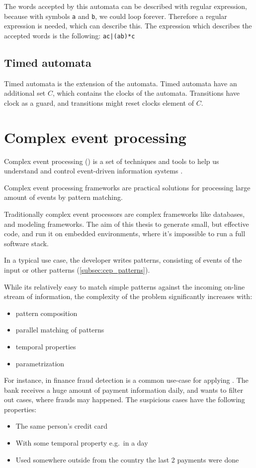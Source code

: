 The words accepted by this automata can be described with regular expression, because with symbols \texttt{a} and \texttt{b}, we could loop forever. Therefore a regular expression is needed, which can describe this. The expression which describes the accepted words is the following: \verb+ac|(ab)*c+

\subsection{Timed automata}

Timed automata is the extension of the automata. Timed automata have an additional set $C$, which contains the clocks of the automata. Transitions have clock as a guard, and transitions might reset clocks element of $C$.

\section{Complex event processing}

Complex event processing (\cep{}) is a set of techniques and tools to help us understand and control event-driven information systems \citep{Luckham:2001:PEI:515781}.

Complex event processing frameworks are practical solutions for processing large amount of events by pattern matching.

Traditionally complex event processors are complex frameworks like databases, and modeling frameworks. The aim of this thesis to generate small, but effective code, and run it on embedded environments, where it's impossible to run a full \cep{} software stack.

In a typical \cep{} use case, the developer writes patterns, consisting of events of the input or other patterns (\cref{subsec:cep_patterns}).

While its relatively easy to match simple patterns against the incoming on-line stream of information, the complexity of the problem significantly increases with:
\begin{itemize}
	\item pattern composition
	\item parallel matching of patterns
	\item temporal properties
	\item parametrization
\end{itemize}

For instance, in finance fraud detection is a common use-case for applying \cep{}. The bank receives a huge amount of payment information daily, and wants to filter out cases, where frauds may happened. The suspicious cases have the following properties:
\begin{itemize}
	\item The same person's credit card
	\item With some temporal property e.g.\ in a day
	\item Used somewhere outside from the country the last 2 payments were done
\end{itemize}

